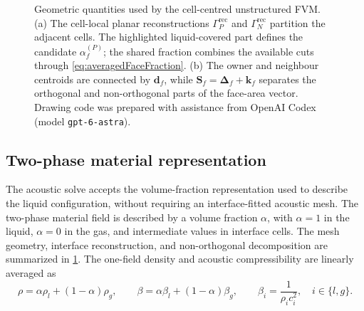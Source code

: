\documentclass[final,12pt,nopreprintline,longtitle]{elsarticle}
\newcommand{\Sf}{\mathbf{S}_f}
\newcommand{\betaac}{\beta}
\newcommand{\schematicAidDisclosure}{Drawing code was prepared with assistance from
OpenAI Codex (model \texttt{gpt-6-astra}).}
\begin{document}
\begin{figure}[t]
{%
    }
    \caption{Geometric quantities used by the cell-centred unstructured FVM.
    (a) The cell-local planar reconstructions $\Gamma_P^{\mathrm{rec}}$ and
    $\Gamma_N^{\mathrm{rec}}$ partition the adjacent cells.  The highlighted
    liquid-covered part defines the candidate $\alpha_f^{(P)}$; the shared
    fraction combines the available cuts through \cref{eq:averagedFaceFraction}.
    (b) The owner and neighbour centroids are connected
    by $\mathbf d_f$, while
    $\Sf=\boldsymbol{\Delta}_f+\mathbf k_f$ separates the orthogonal and
    non-orthogonal parts of the face-area vector.  \schematicAidDisclosure}
    \label{fig:unstructuredFVMSchematic}
\end{figure}

\subsection{Two-phase material representation}
\label{sec:materialRepresentation}

The acoustic solve accepts the volume-fraction representation used to
describe the liquid configuration, without requiring an interface-fitted
acoustic mesh.  The two-phase material field is described by a volume fraction $\alpha$, with
$\alpha=1$ in the liquid, $\alpha=0$ in the gas, and intermediate values
in interface cells.  The mesh geometry, interface reconstruction, and
non-orthogonal decomposition are summarized in
\cref{fig:unstructuredFVMSchematic}.  The one-field density and acoustic
compressibility are linearly averaged as
\begin{equation}
    \rho=\alpha\rho_l+(1-\alpha)\rho_g,
    \qquad
    \betaac
    =\alpha\betaac_l+(1-\alpha)\betaac_g,
    \qquad
    \betaac_i=\frac{1}{\rho_i c_i^2},\quad i\in\{l,g\}.
    \label{eq:materialAverages}
\end{equation}
\end{document}
